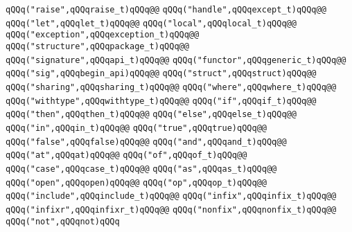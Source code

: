 \verb|qQQq("raise",qQQqraise_t)qQQq@@|\newline
\verb|qQQq("handle",qQQqexcept_t)qQQq@@|\newline
\verb|qQQq("let",qQQqlet_t)qQQq@@|\newline
\verb|qQQq("local",qQQqlocal_t)qQQq@@|\newline
\verb|qQQq("exception",qQQqexception_t)qQQq@@|\newline
\verb|qQQq("structure",qQQqpackage_t)qQQq@@|\newline
\verb|qQQq("signature",qQQqapi_t)qQQq@@|\newline
\verb|qQQq("functor",qQQqgeneric_t)qQQq@@|\newline
\verb|qQQq("sig",qQQqbegin_api)qQQq@@|\newline
\verb|qQQq("struct",qQQqstruct)qQQq@@|\newline
\verb|qQQq("sharing",qQQqsharing_t)qQQq@@|\newline
\verb|qQQq("where",qQQqwhere_t)qQQq@@|\newline
\verb|qQQq("withtype",qQQqwithtype_t)qQQq@@|\newline
\verb|qQQq("if",qQQqif_t)qQQq@@|\newline
\verb|qQQq("then",qQQqthen_t)qQQq@@|\newline
\verb|qQQq("else",qQQqelse_t)qQQq@@|\newline
\verb|qQQq("in",qQQqin_t)qQQq@@|\newline
\verb|qQQq("true",qQQqtrue)qQQq@@|\newline
\verb|qQQq("false",qQQqfalse)qQQq@@|\newline
\verb|qQQq("and",qQQqand_t)qQQq@@|\newline
\verb|qQQq("at",qQQqat)qQQq@@|\newline
\verb|qQQq("of",qQQqof_t)qQQq@@|\newline
\verb|qQQq("case",qQQqcase_t)qQQq@@|\newline
\verb|qQQq("as",qQQqas_t)qQQq@@|\newline
\verb|qQQq("open",qQQqopen)qQQq@@|\newline
\verb|qQQq("op",qQQqop_t)qQQq@@|\newline
\verb|qQQq("include",qQQqinclude_t)qQQq@@|\newline
\verb|qQQq("infix",qQQqinfix_t)qQQq@@|\newline
\verb|qQQq("infixr",qQQqinfixr_t)qQQq@@|\newline
\verb|qQQq("nonfix",qQQqnonfix_t)qQQq@@|\newline
\verb|qQQq("not",qQQqnot)qQQq|\newline
